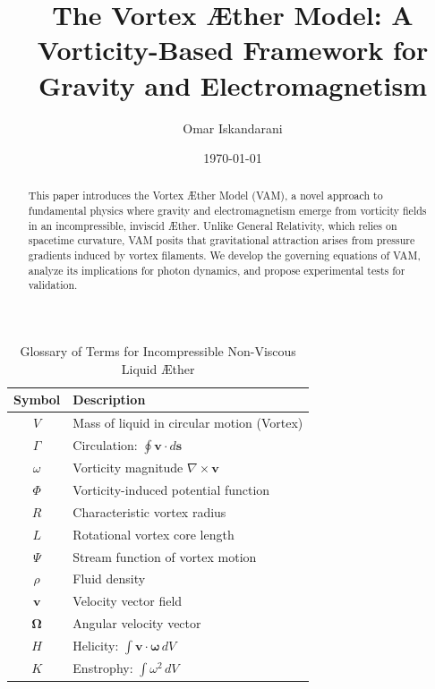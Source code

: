 \documentclass[a4paper,10pt]{article}
\title{The Vortex \AE ther Model: A Vorticity-Based Framework for Gravity and Electromagnetism}
\author{Omar Iskandarani}
\date{\today}
\begin{document}
    \maketitle

    \maketitle
    \tableofcontents
    \newpage

    \begin{abstract}
        This paper introduces the Vortex \AE ther Model (VAM), a novel approach to fundamental physics where gravity and electromagnetism emerge from vorticity fields in an incompressible, inviscid \AE ther.
        Unlike General Relativity, which relies on spacetime curvature, VAM posits that gravitational attraction arises from pressure gradients induced by vortex filaments.
        We develop the governing equations of VAM, analyze its implications for photon dynamics, and propose experimental tests for validation.
    \end{abstract}



        \begin{table}[h]
            \centering
            \renewcommand{\arraystretch}{1.3}
            \begin{tabular}{c l}
                \toprule
                Symbol & Description \\
                \midrule
                \( V \) & Mass of liquid in circular motion (Vortex) \\
                \( \Gamma \) & Circulation: \( \oint \mathbf{v} \cdot d\mathbf{s} \) \\
                \( \omega \) & Vorticity magnitude \(\nabla \times \mathbf{v} \) \\
                \( \Phi \) & Vorticity-induced potential function \\
                \( R \) & Characteristic vortex radius \\
                \( L \) & Rotational vortex core length \\
                \( \Psi \) & Stream function of vortex motion \\
                \( \rho \) & Fluid density \\
                \( \mathbf{v} \) & Velocity vector field \\
                \( \mathbf{\Omega} \) & Angular velocity vector \\
                \( H \) & Helicity: \( \int \mathbf{v} \cdot \mathbf{\omega} \, dV \) \\
                \( K \) & Enstrophy: \( \int \omega^2 \, dV \) \\
                \bottomrule
            \end{tabular}
            \caption{Glossary of Terms for Incompressible Non-Viscous Liquid Æther}
            \label{tab:notation}
        \end{table}
\end{document}
